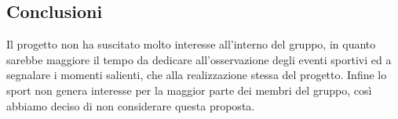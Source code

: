 \documentclass[../studio-di-fattibilita.tex]{subfiles}
\begin{document}
	\subsection{Conclusioni}
	\label{sec:conclusioni}
	Il progetto non ha suscitato molto interesse all'interno del gruppo, in quanto sarebbe maggiore il tempo da dedicare all'osservazione degli eventi sportivi ed a segnalare i momenti salienti, che alla realizzazione stessa del progetto. Infine lo sport non genera interesse per la maggior parte dei membri del gruppo, così abbiamo deciso di non considerare questa proposta.
\end{document}
